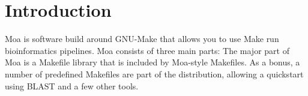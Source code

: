 \chapter{Introduction}

Moa is software build around GNU-Make that allows you to use Make run
bioinformatics pipelines. Moa consists of three main parts:
\sa
 The major part of Moa is a Makefile library
that is included by Moa-style Makefiles. As a bonus, a number of
predefined Makefiles are part of the distribution, allowing a
quickstart using BLAST \citep{Altschul1990} and a few other tools.

